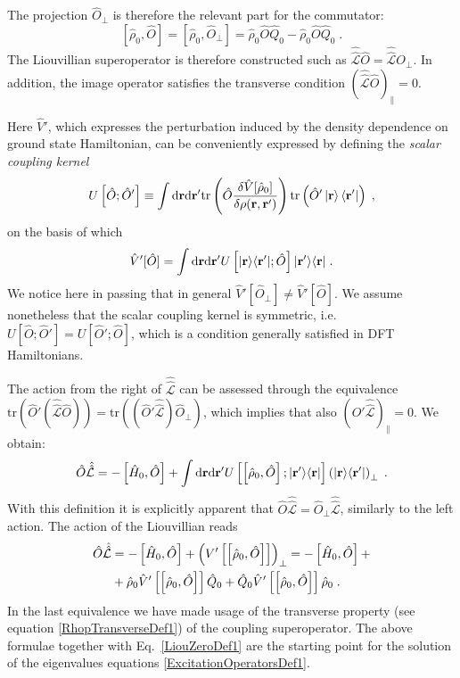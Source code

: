 \documentclass[reprint,aps,prb]{revtex4-1}
\newcommand{\dd}{{\rm d}}
\renewcommand{\r}{{\bf r}}
\newcommand{\be}{\begin{equation}}
\newcommand{\ee}{\end{equation}}
\newcommand{\nn}{\notag}
\newcommand{\lb}{\label}
\newcommand{\op}[1]{\hat {#1}}
\newcommand{\sop}[1]{\op{\op {#1}}}
\newcommand{\commutator}[2]{\left[ {#1} , {#2} \right]}
\newcommand{\trace}[1]{\mathrm{tr}\left(#1\right)}
\newcommand{\ketbra}[2]{| #1 \rangle \langle #2 |}
\newcommand{\dmnot}{\op{\rho}_0}
\newcommand{\hnot}{\op{H}_0}
\newcommand{\Liouv}{\sop{\mathcal L}}
\begin{document}
The projection $\op O_\perp$ is therefore the relevant part for the commutator:
\begin{equation}
\commutator{\dmnot}{\op O} = \commutator{\dmnot}{\op O_\perp} =
\dmnot \op O \op Q_0  - \dmnot \op O \op Q_0 \;.
\end{equation}
The Liouvillian superoperator is therefore constructed such as $\Liouv \op O = \Liouv O_\perp$. In addition, the image operator satisfies the transverse condition
$\left( \Liouv \op O \right)_\parallel =0$.

Here $\op V'$, which expresses the perturbation induced by the density dependence on ground state Hamiltonian, can be conveniently expressed by defining the
\emph{scalar coupling kernel}
\be\lb{CouplingKernelDef1}
U\left[\op O; \op O'\right] \equiv  \int \dd \r \dd \r' \trace{\op O \frac{\delta \op V[\dmnot] }{\delta \rho(\r,\r')}
} \trace{\op O' \ket{\r} \bra{\r'}}\;,
\ee
on the basis of which
\be\lb{VpDef1}
\op V'[\op O]=
\int \dd \r \dd \r' U\left[\ketbra{\r}{\r'};\op O\right] \ketbra{\r'}{\r}\;.
\ee
We notice here in passing that in general $\op V'[\op O_\perp] \neq \op V'[\op O]$.
We assume nonetheless that the scalar coupling kernel is symmetric, i.e. $U\left[\op O; \op O'\right] = U\left[\op O'; \op O\right]$, which is a condition generally satisfied in DFT Hamiltonians.

The action from the right of $\Liouv$ can be assessed through the equivalence $\trace{\op O'(\Liouv\op O)} = \trace{(\op O'\Liouv)\op O_\perp}$, which implies that also
$\left(\op O' \Liouv\right)_\parallel =0$. We obtain:
\be
\op O\Liouv = -\commutator{\hnot}{\op O} + \int \dd\r\dd\r'
U\left[\commutator{\dmnot}{\op O};\ketbra{\r'}{\r}\right]\left(\ketbra{\r}{\r'}\right)_\perp \;. \nn
\ee
With this definition it is explicitly apparent that $\op O\Liouv=\op O_\perp \Liouv$,
similarly to the left action. The action of the Liouvillian reads
\begin{align}\lb{LiouvillianRightActionDef1}
\op O\Liouv &= -\commutator{\hnot}{\op O} + \left(V'\left[\commutator{{\dmnot}}{\op O}\right]\right)_\perp = -\commutator{\hnot}{\op O} + \nn \\
&+ \dmnot\op V'\left[\commutator{{\dmnot}}{\op O}\right]\op Q_0 + \op Q_0\op V'\left[\commutator{\dmnot}{\op O}\right]\dmnot \;.
\end{align}
In the last equivalence we have made usage of the transverse property (see equation \eqref{RhopTransverseDef1}) of the coupling superoperator. The above formulae
together with Eq.~\eqref{LiouZeroDef1} are the starting point for the solution of the eigenvalues equations \eqref{ExcitationOperatorsDef1}.
\end{document}

